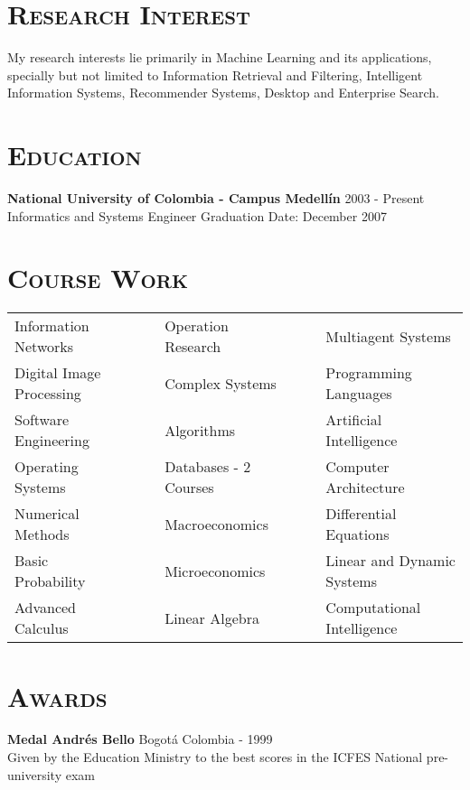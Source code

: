 \begin{resume}


\section{\textsc{Research Interest}}
My research interests lie primarily in Machine Learning and its applications, specially but  not limited to Information Retrieval and Filtering, Intelligent Information Systems, Recommender Systems, Desktop and Enterprise Search.
\newline

\section{\textsc{Education}}
\textbf{National University of Colombia - Campus Medell\'{i}n} \hfill 2003 - Present \\
{\large Informatics and Systems Engineer} \hfill Graduation Date: December 2007\\

\section{\textsc{Course Work}}
  \begin{tabular}{lllll}
Information Networks   & \ \ &  Operation Research   & \ \ &
Multiagent Systems  \\ 
Digital Image Processing     & \ \ & Complex Systems  & \ \ & Programming Languages \\
Software Engineering   & \ \ & Algorithms          & \ \ & Artificial Intelligence     \\
Operating Systems      & \ \ & Databases - 2 Courses          & \ \ & Computer Architecture \\
Numerical Methods      & \ \ & Macroeconomics       & \ \ & Differential Equations      \\
Basic Probability      & \ \ & Microeconomics      & \ \ & Linear and Dynamic Systems      \\
Advanced Calculus      & \ \ & Linear Algebra    & \ \ & Computational Intelligence   \\
\end{tabular}
\newline



\section{\textsc{Awards}}
\textbf{Medal Andr\'{e}s Bello} \hfill  Bogot\'{a} Colombia - 1999 \\
Given by the Education Ministry to the best scores in the ICFES National pre-university exam \hfill \\
\newline


\end{resume}
